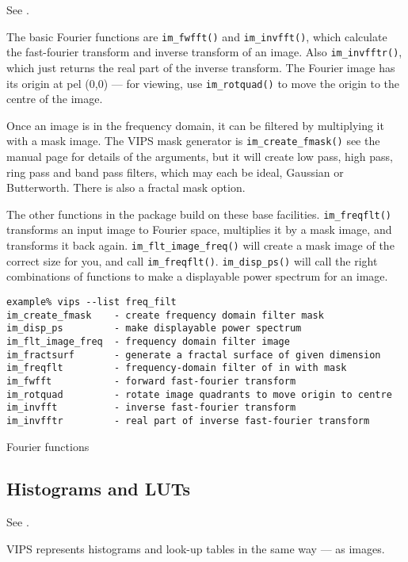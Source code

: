 See .

The basic Fourier functions are \verb+im_fwfft()+ and
\verb+im_invfft()+, which calculate the fast-fourier transform and inverse
transform of an image. Also \verb+im_invfftr()+, which just returns the real
part of the inverse transform.
The Fourier image has its origin at pel (0,0) ---
for viewing, use \verb+im_rotquad()+ to move the origin to the centre of
the image.

Once an image is in the frequency domain, it can be filtered by multiplying
it with a mask image. The VIPS mask generator is \verb+im_create_fmask()+
see the manual page for details of the arguments, but it will create low
pass, high pass, ring pass and band pass filters, which may each be ideal,
Gaussian or Butterworth. There is also a fractal mask option.

The other functions in the package build on these base
facilities. \verb+im_freqflt()+ transforms an input image to
Fourier space, multiplies it by a mask image, and transforms it back
again. \verb+im_flt_image_freq()+ will create a mask image of the correct
size for you, and call \verb+im_freqflt()+.  \verb+im_disp_ps()+ will call
the right combinations of functions to make a displayable power spectrum
for an image.

\begin{fig2}
\begin{verbatim}
example% vips --list freq_filt    
im_create_fmask    - create frequency domain filter mask
im_disp_ps         - make displayable power spectrum
im_flt_image_freq  - frequency domain filter image
im_fractsurf       - generate a fractal surface of given dimension
im_freqflt         - frequency-domain filter of in with mask
im_fwfft           - forward fast-fourier transform
im_rotquad         - rotate image quadrants to move origin to centre
im_invfft          - inverse fast-fourier transform
im_invfftr         - real part of inverse fast-fourier transform
\end{verbatim}
\caption{Fourier functions}
\label{fg:freq}
\end{fig2}

\subsection{Histograms and LUTs}

See .

VIPS represents histograms and look-up tables in the same way --- as images.

